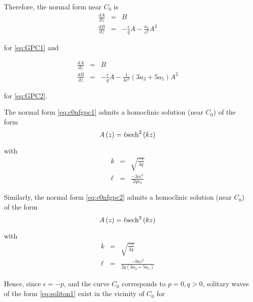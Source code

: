 Therefore, the normal form near $C_0$ is
\begin{subequations}\label{eq:c0nfgpc1}
\begin{eqnarray}
\frac{dA}{dz} &=& B \\
\frac{dB}{dz} &=& -\frac{\epsilon}{q} A - \frac{a_3}{ c^2} A^2
\end{eqnarray}
\end{subequations}

for \eqref{eq:GPC1} and

\begin{subequations}\label{eq:c0nfgpc2}
\begin{eqnarray}
\frac{dA}{dz} &=& B \\
\frac{dB}{dz} &=& -\frac{\epsilon}{q} A - \frac{1}{3 c^2} \left(3 a_3 + 5 a_5 \right) A^2
\end{eqnarray}
\end{subequations}

for \eqref{eq:GPC2}.

The normal form \eqref{eq:c0nfgpc1} admits a homoclinic solution (near $C_0$) of the form 
\begin{equation} \label{eq:soliton1}
A\left(z\right) = \ell \space \mathrm{sech}^2\left(k z\right)
\end{equation}

with 
\begin{subequations} 
\begin{eqnarray}
k &=& \sqrt{\frac{-\epsilon}{4q}}  \\
\ell &=& \frac{ - 3 \epsilon c^2 }{2 q a_3 } 
\end{eqnarray}
\end{subequations}


Similarly, the normal form \eqref{eq:c0nfgpc2} admits a homoclinic solution (near $C_0$) of the form 
\begin{equation}\label{eq:soliton2}
A\left(z\right) = \ell \space \mathrm{sech}^2\left(k z\right)
\end{equation}

with 
\begin{subequations} 
\begin{eqnarray}
k &=& \sqrt{\frac{-\epsilon}{4q}} \label{eq:keq} \\
\ell &=& \frac{ - 9 \epsilon c^2 }{2 q \left(3 a_3 + 5 a_5\right) } 
\end{eqnarray}
\end{subequations}

Hence, since $\epsilon = - p $, and the curve $C_0$ corresponds to $p=0,q>0$, solitary waves of the 
form \eqref{eq:soliton1} exist in the vicinity of $C_0$ for 

